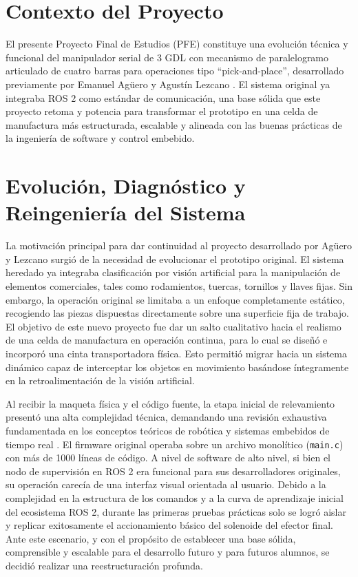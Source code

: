 \documentclass[12pt, a4paper]{report}
\begin{document}
\section{Contexto del Proyecto}
El presente Proyecto Final de Estudios (PFE) constituye una evolución técnica y funcional del manipulador serial de 3 GDL con mecanismo de paralelogramo articulado de cuatro barras para operaciones tipo ``pick-and-place'', desarrollado previamente por Emanuel Agüero y Agustín Lezcano \cite{bib:aguero}. El sistema original ya integraba ROS 2 como estándar de comunicación, una base sólida que este proyecto retoma y potencia para transformar el prototipo en una celda de manufactura más estructurada, escalable y alineada con las buenas prácticas de la ingeniería de software y control embebido.

\section{Evolución, Diagnóstico y Reingeniería del Sistema}
La motivación principal para dar continuidad al proyecto desarrollado por Agüero y Lezcano surgió de la necesidad de evolucionar el prototipo original. El sistema heredado ya integraba clasificación por visión artificial para la manipulación de elementos comerciales, tales como rodamientos, tuercas, tornillos y llaves fijas. Sin embargo, la operación original se limitaba a un enfoque completamente estático, recogiendo las piezas dispuestas directamente sobre una superficie fija de trabajo. El objetivo de este nuevo proyecto fue dar un salto cualitativo hacia el realismo de una celda de manufactura en operación continua, para lo cual se diseñó e incorporó una cinta transportadora física. Esto permitió migrar hacia un sistema dinámico capaz de interceptar los objetos en movimiento basándose íntegramente en la retroalimentación de la visión artificial.

Al recibir la maqueta física y el código fuente, la etapa inicial de relevamiento presentó una alta complejidad técnica, demandando una revisión exhaustiva fundamentada en los conceptos teóricos de robótica y sistemas embebidos de tiempo real \cite{bib:robotica, bib:micro}. El firmware original operaba sobre un archivo monolítico (\texttt{main.c}) con más de 1000 líneas de código. A nivel de software de alto nivel, si bien el nodo de supervisión en ROS 2 era funcional para sus desarrolladores originales, su operación carecía de una interfaz visual orientada al usuario. Debido a la complejidad en la estructura de los comandos y a la curva de aprendizaje inicial del ecosistema ROS 2, durante las primeras pruebas prácticas solo se logró aislar y replicar exitosamente el accionamiento básico del solenoide del efector final. Ante este escenario, y con el propósito de establecer una base sólida, comprensible y escalable para el desarrollo futuro y para futuros alumnos, se decidió realizar una reestructuración profunda.
\end{document}
